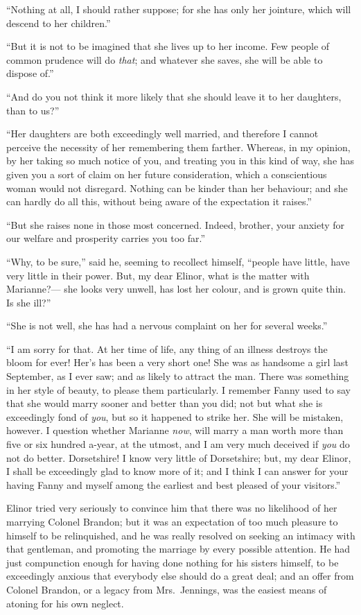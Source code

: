 ``Nothing at all, I should rather suppose; for she has
only her jointure, which will descend to her children.''

``But it is not to be imagined that she lives up to
her income.  Few people of common prudence will do \emph{that};
and whatever she saves, she will be able to dispose of.''

``And do you not think it more likely that she
should leave it to her daughters, than to us?''

``Her daughters are both exceedingly well married,
and therefore I cannot perceive the necessity of her
remembering them farther.  Whereas, in my opinion, by her
taking so much notice of you, and treating you in this
kind of way, she has given you a sort of claim on her
future consideration, which a conscientious woman would
not disregard.  Nothing can be kinder than her behaviour;
and she can hardly do all this, without being aware
of the expectation it raises.''

``But she raises none in those most concerned.
Indeed, brother, your anxiety for our welfare and prosperity
carries you too far.''

``Why, to be sure,'' said he, seeming to recollect himself,
``people have little, have very little in their power.
But, my dear Elinor, what is the matter with Marianne?---%
she looks very unwell, has lost her colour, and is grown
quite thin.  Is she ill?''

``She is not well, she has had a nervous complaint
on her for several weeks.''

``I am sorry for that.  At her time of life,
any thing of an illness destroys the bloom for ever!
Her's has been a very short one!  She was as handsome a girl
last September, as I ever saw; and as likely to attract
the man.  There was something in her style of beauty,
to please them particularly.  I remember Fanny used to say
that she would marry sooner and better than you did;
not but what she is exceedingly fond of \emph{you}, but so it
happened to strike her.  She will be mistaken, however.
I question whether Marianne \emph{now}, will marry a man worth
more than five or six hundred a-year, at the utmost,
and I am very much deceived if \emph{you} do not do better.
Dorsetshire!  I know very little of Dorsetshire; but, my dear
Elinor, I shall be exceedingly glad to know more of it;
and I think I can answer for your having Fanny and myself
among the earliest and best pleased of your visitors.''

Elinor tried very seriously to convince him that
there was no likelihood of her marrying Colonel Brandon;
but it was an expectation of too much pleasure to himself
to be relinquished, and he was really resolved on seeking
an intimacy with that gentleman, and promoting the marriage
by every possible attention.  He had just compunction
enough for having done nothing for his sisters himself,
to be exceedingly anxious that everybody else should
do a great deal; and an offer from Colonel Brandon,
or a legacy from Mrs.\ Jennings, was the easiest means
of atoning for his own neglect.

